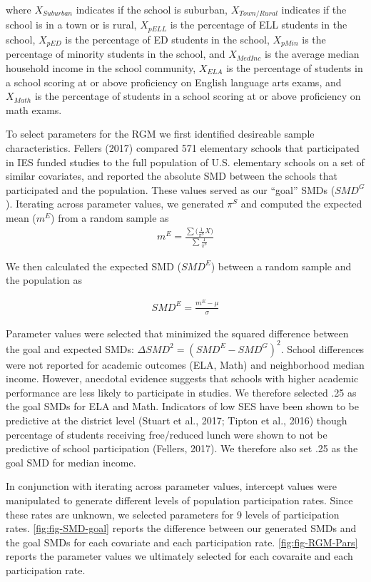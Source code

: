 \documentclass[man,floatsintext]{apa6}
\begin{document}
where \(X_{Suburban}\) indicates if the school is suburban, \(X_{Town/Rural}\) indicates if the school is in a town or is rural, \(X_{pELL}\) is the percentage of ELL students in the school, \(X_{pED}\) is the percentage of ED students in the school, \(X_{pMin}\) is the percentage of minority students in the school, and \(X_{MedInc}\) is the average median household income in the school community, \(X_{ELA}\) is the percentage of students in a school scoring at or above proficiency on English language arts exams, and \(X_{Math}\) is the percentage of students in a school scoring at or above proficiency on math exams.

To select parameters for the RGM we first identified desireable sample characteristics. Fellers (2017) compared 571 elementary schools that participated in IES funded studies to the full population of U.S. elementary schools on a set of similar covariates, and reported the absolute SMD between the schools that participated and the population. These values served as our \enquote{goal} SMDs (\(SMD^G\)). Iterating across parameter values, we generated \(\pi^S\) and computed the expected mean (\(m^E\)) from a random sample as
\begin{align}
  m^E = \frac{\sum{(\frac{1}{\pi^S} X})}{\sum{\frac{1}{\pi^S}}}
\end{align}

We then calculated the expected SMD (\(SMD^E\)) between a random sample and the population as

\begin{align}
  SMD^E = \frac{m^E - \mu}{\sigma}
\end{align}

Parameter values were selected that minimized the squared difference between the goal and expected SMDs: \(\Delta SMD^2 = (SMD^E-SMD^G)^2\). School differences were not reported for academic outcomes (ELA, Math) and neighborhood median income. However, anecdotal evidence suggests that schools with higher academic performance are less likely to participate in studies. We therefore selected .25 as the goal SMDs for ELA and Math. Indicators of low SES have been shown to be predictive at the district level (Stuart et al., 2017; Tipton et al., 2016) though percentage of students receiving free/reduced lunch were shown to not be predictive of school participation (Fellers, 2017). We therefore also set .25 as the goal SMD for median income.

In conjunction with iterating across parameter values, intercept values were manipulated to generate different levels of population participation rates. Since these rates are unknown, we selected parameters for 9 levels of participation rates. \ref{fig:fig-SMD-goal} reports the difference between our generated SMDs and the goal SMDs for each covariate and each participation rate. \ref{fig:fig-RGM-Pars} reports the parameter values we ultimately selected for each covaraite and each participation rate.
\end{document}
